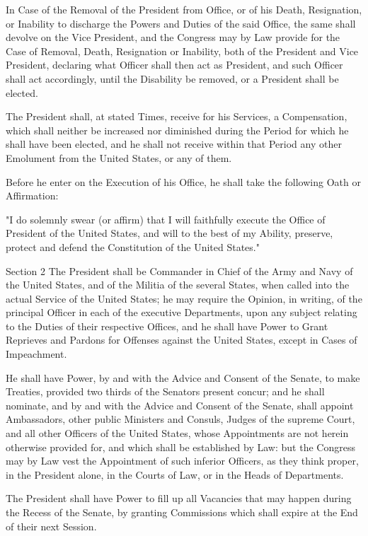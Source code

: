 \documentclass[12pt,a4paper]{article}
\begin{document}
In Case of the Removal of the President from Office, or of his Death,
Resignation, or Inability to discharge the Powers and Duties of the said
Office, the same shall devolve on the Vice President, and the Congress may by
Law provide for the Case of Removal, Death, Resignation or Inability, both of
the President and Vice President, declaring what Officer shall then act as
President, and such Officer shall act accordingly, until the Disability be
removed, or a President shall be elected.

The President shall, at stated Times, receive for his Services, a Compensation,
which shall neither be increased nor diminished during the Period for which he
shall have been elected, and he shall not receive within that Period any other
Emolument from the United States, or any of them.

Before he enter on the Execution of his Office, he shall take the following
Oath or Affirmation:

"I do solemnly swear (or affirm) that I will faithfully execute the Office of
President of the United States, and will to the best of my Ability, preserve,
protect and defend the Constitution of the United States."

Section 2
The President shall be Commander in Chief of the Army and Navy of the United
States, and of the Militia of the several States, when called into the actual
Service of the United States; he may require the Opinion, in writing, of the
principal Officer in each of the executive Departments, upon any subject
relating to the Duties of their respective Offices, and he shall have Power to
Grant Reprieves and Pardons for Offenses against the United States, except in
Cases of Impeachment.

He shall have Power, by and with the Advice and Consent of the Senate, to make
Treaties, provided two thirds of the Senators present concur; and he shall
nominate, and by and with the Advice and Consent of the Senate, shall appoint
Ambassadors, other public Ministers and Consuls, Judges of the supreme Court,
and all other Officers of the United States, whose Appointments are not herein
otherwise provided for, and which shall be established by Law: but the Congress
may by Law vest the Appointment of such inferior Officers, as they think
proper, in the President alone, in the Courts of Law, or in the Heads of
Departments.

The President shall have Power to fill up all Vacancies that may happen during
the Recess of the Senate, by granting Commissions which shall expire at the End
of their next Session.
\end{document}
